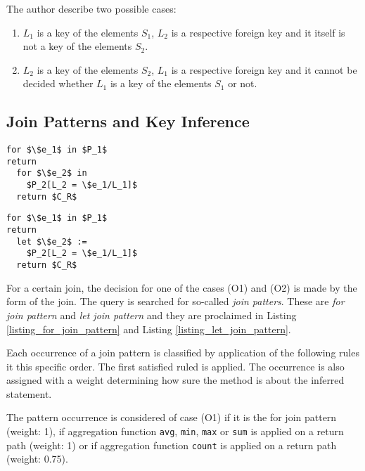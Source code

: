 The author describe two possible cases:

\begin{enumerate}
\renewcommand{\theenumi}{(O\arabic{enumi})}
\renewcommand{\labelenumi}{\theenumi}
\item $L_1$ is a key of the elements $S_1$, $L_2$ is a respective foreign key and it itself is not a key of the elements $S_2$.
\item $L_2$ is a key of the elements $S_2$, $L_1$ is a respective foreign key and it cannot be decided whether $L_1$ is a key of the elements $S_1$ or not.
\end{enumerate}

\subsection{Join Patterns and Key Inference}
\begin{lstlisting}[mathescape, float, caption=For join pattern., frame=single, label=listing_for_join_pattern]
for $\$e_1$ in $P_1$
return
  for $\$e_2$ in
    $P_2[L_2 = \$e_1/L_1]$
  return $C_R$
\end{lstlisting}

\begin{lstlisting}[mathescape, float, caption=Let join pattern., frame=single, label=listing_let_join_pattern]
for $\$e_1$ in $P_1$
return
  let $\$e_2$ :=
    $P_2[L_2 = \$e_1/L_1]$
  return $C_R$
\end{lstlisting}

For a certain join, the decision for one of the cases (O1) and (O2) is made by the form of the join. The query is searched for so-called \emph{join patters}. These are \emph{for join pattern} and \emph{let join pattern} and they are proclaimed in Listing \ref{listing_for_join_pattern} and Listing \ref{listing_let_join_pattern}.

Each occurrence of a join pattern is classified by application of the following rules it this specific order. The first satisfied ruled is applied. The occurrence is also assigned with a weight determining how sure the method is about the inferred statement.

The pattern occurrence is considered of case (O1) if it is the for join pattern (weight: 1), if aggregation function \texttt{avg}, \texttt{min}, \texttt{max} or \texttt{sum} is applied on a return path (weight: 1) or if aggregation function \texttt{count} is applied on a return path (weight: 0.75). 

